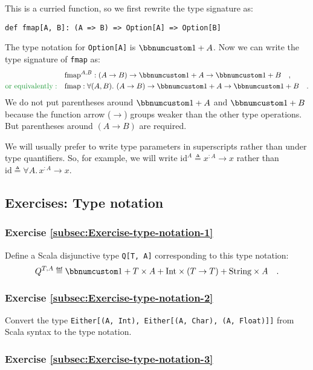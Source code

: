 This is a curried function, so we first rewrite the type signature
as:
\begin{lstlisting}
def fmap[A, B]: (A => B) => Option[A] => Option[B]
\end{lstlisting}
The type notation for \lstinline!Option[A]! is $\bbnum 1+A$. Now
we can write the type signature of \lstinline!fmap! as:
\begin{align*}
 & \text{fmap}^{A,B}:\left(A\rightarrow B\right)\rightarrow\bbnum 1+A\rightarrow\bbnum 1+B\quad,\\
{\color{greenunder}\text{or equivalently}:}\quad & \text{fmap}:\forall(A,B).\,\left(A\rightarrow B\right)\rightarrow\bbnum 1+A\rightarrow\bbnum 1+B\quad.
\end{align*}
We do not put parentheses around $\bbnum 1+A$ and $\bbnum 1+B$ because
the function arrow ($\rightarrow$) groups weaker than the other type
operations. But parentheses around $\left(A\rightarrow B\right)$
are required.

We will usually prefer to write type parameters in superscripts rather
than under type quantifiers. So, for example, we will write $\text{id}^{A}\triangleq x^{:A}\rightarrow x$
rather than $\text{id}\triangleq\forall A.\,x^{:A}\rightarrow x$.

\subsection{Exercises: Type notation}

\subsubsection{Exercise \label{subsec:Exercise-type-notation-1}\ref{subsec:Exercise-type-notation-1}}

Define a Scala disjunctive type \lstinline!Q[T, A]! corresponding
to this type notation:
\[
Q^{T,A}\triangleq\bbnum 1+T\times A+\text{Int}\times(T\rightarrow T)+\text{String}\times A\quad.
\]


\subsubsection{Exercise \label{subsec:Exercise-type-notation-2}\ref{subsec:Exercise-type-notation-2}}

Convert the type \lstinline!Either[(A, Int), Either[(A, Char), (A, Float)]]!
from Scala syntax to the type notation. 

\subsubsection{Exercise \label{subsec:Exercise-type-notation-3}\ref{subsec:Exercise-type-notation-3}}

